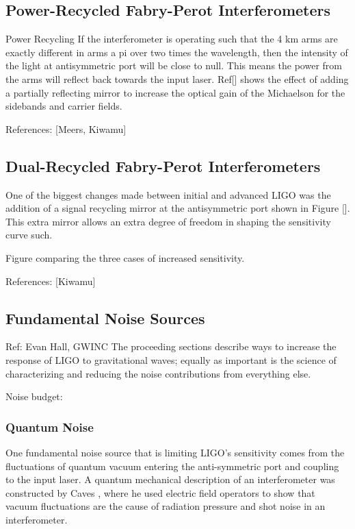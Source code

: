 		\subsection{Power-Recycled Fabry-Perot Interferometers}
		Power Recycling
		If the interferometer is operating such that the 4 km arms are exactly different in arms a pi over two times the wavelength, then the intensity of the light at antisymmetric port will be close to null.  This means the power from the arms will reflect back towards the input laser.  Ref[] shows the effect of adding a partially reflecting mirror to increase the optical gain of the Michaelson for the sidebands and carrier fields.
		
		
		
		References: [Meers, Kiwamu]
		
		\subsection{Dual-Recycled Fabry-Perot Interferometers}\label{DRMI}
		
		One of the biggest changes made between initial and advanced LIGO was the addition of a signal recycling mirror at the antisymmetric port shown in Figure []. This extra mirror allows an extra degree of freedom in shaping the sensitivity curve such.
		
		
		Figure comparing the three cases of increased sensitivity.
		
		References: [Kiwamu]
		
		\subsection{Fundamental Noise Sources}
		Ref: Evan Hall, GWINC
		The proceeding sections describe ways to increase the response of LIGO to gravitational waves; equally as important is the science of characterizing and reducing the noise contributions from everything else.
		
		Noise budget:
		
		\subsubsection{Quantum Noise}

		One fundamental noise source that is limiting LIGO's sensitivity comes from the fluctuations of quantum vacuum entering the anti-symmetric port and coupling to the input laser. A quantum mechanical description of an interferometer was constructed by Caves \cite{CavesQMNoise}\cite{Caves2photon} \cite{CavesOscillator}, where he used electric field operators to show that vacuum fluctuations are the cause of radiation pressure and shot noise in an interferometer.
		
